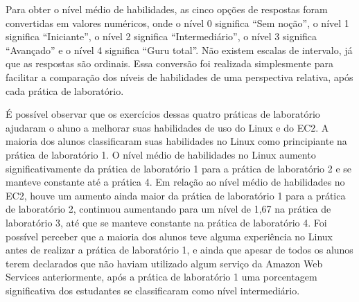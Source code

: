 \begin{figure}[htb!] 
   	    \captionsetup{width=15cm}%
\end{figure}

Para obter o nível médio de habilidades, as cinco opções de respostas foram convertidas em valores numéricos, onde o nível 0 significa “Sem noção”, o nível 1 significa “Iniciante”, o nível 2 significa “Intermediário”, o nível 3 significa
“Avançado” e o nível 4 significa “Guru total”. Não existem escalas de intervalo, já que as respostas são ordinais. Essa conversão foi realizada simplesmente para facilitar a comparação dos níveis de habilidades de uma perspectiva relativa, após cada prática de laboratório. 

É possível observar que os exercícios  dessas quatro práticas de laboratório ajudaram o aluno a melhorar suas habilidades de uso do Linux e do EC2. A maioria dos alunos classificaram suas habilidades no Linux como principiante na prática de laboratório 1. O nível médio de habilidades no Linux aumento significativamente da prática de laboratório 1 para a prática de laboratório 2 e se manteve constante até a prática 4.
Em relação ao nível médio de habilidades no EC2, houve um aumento ainda maior da prática de laboratório 1 para a prática de laboratório 2, continuou aumentando para um nível de 1,67 na prática de laboratório 3, até que se manteve constante na prática de laboratório 4. Foi possível perceber que a maioria dos alunos teve alguma experiência no Linux antes de realizar a prática de laboratório 1, e ainda que apesar de todos os alunos terem declarados que não haviam utilizado algum serviço da Amazon Web Services anteriormente, após a prática de laboratório 1 uma porcentagem significativa dos estudantes se classificaram como nível intermediário.


